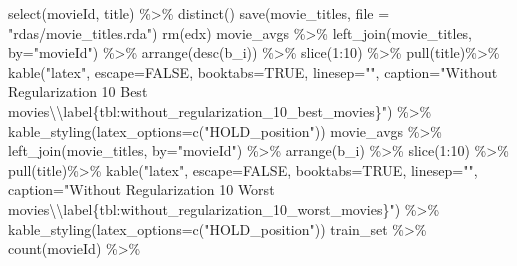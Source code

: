 \documentclass[
]{article}
\newenvironment{Shaded}{}{}
\newcommand{\AttributeTok}[1]{\textcolor[rgb]{0.49,0.56,0.16}{#1}}
\newcommand{\ConstantTok}[1]{\textcolor[rgb]{0.53,0.00,0.00}{#1}}
\newcommand{\DecValTok}[1]{\textcolor[rgb]{0.25,0.63,0.44}{#1}}
\newcommand{\FunctionTok}[1]{\textcolor[rgb]{0.02,0.16,0.49}{#1}}
\newcommand{\NormalTok}[1]{#1}
\newcommand{\SpecialCharTok}[1]{\textcolor[rgb]{0.25,0.44,0.63}{#1}}
\newcommand{\StringTok}[1]{\textcolor[rgb]{0.25,0.44,0.63}{#1}}
\begin{document}
\begin{Shaded}
\begin{Highlighting}[]
  \FunctionTok{select}\NormalTok{(movieId, title) }\SpecialCharTok{\%\textgreater{}\%}
  \FunctionTok{distinct}\NormalTok{()}
\FunctionTok{save}\NormalTok{(movie\_titles, }\AttributeTok{file =} \StringTok{"rdas/movie\_titles.rda"}\NormalTok{)}
\FunctionTok{rm}\NormalTok{(edx)}
\NormalTok{movie\_avgs }\SpecialCharTok{\%\textgreater{}\%} \FunctionTok{left\_join}\NormalTok{(movie\_titles, }\AttributeTok{by=}\StringTok{"movieId"}\NormalTok{) }\SpecialCharTok{\%\textgreater{}\%}
  \FunctionTok{arrange}\NormalTok{(}\FunctionTok{desc}\NormalTok{(b\_i)) }\SpecialCharTok{\%\textgreater{}\%} 
  \FunctionTok{slice}\NormalTok{(}\DecValTok{1}\SpecialCharTok{:}\DecValTok{10}\NormalTok{)  }\SpecialCharTok{\%\textgreater{}\%} 
  \FunctionTok{pull}\NormalTok{(title)}\SpecialCharTok{\%\textgreater{}\%} 
  \FunctionTok{kable}\NormalTok{(}\StringTok{"latex"}\NormalTok{, }\AttributeTok{escape=}\ConstantTok{FALSE}\NormalTok{, }\AttributeTok{booktabs=}\ConstantTok{TRUE}\NormalTok{, }\AttributeTok{linesep=}\StringTok{""}\NormalTok{, }\AttributeTok{caption=}\StringTok{"Without Regularization 10 Best movies}\SpecialCharTok{\textbackslash{}\textbackslash{}}\StringTok{label\{tbl:without\_regularization\_10\_best\_movies\}"}\NormalTok{) }\SpecialCharTok{\%\textgreater{}\%}
    \FunctionTok{kable\_styling}\NormalTok{(}\AttributeTok{latex\_options=}\FunctionTok{c}\NormalTok{(}\StringTok{"HOLD\_position"}\NormalTok{))}
\NormalTok{movie\_avgs }\SpecialCharTok{\%\textgreater{}\%} \FunctionTok{left\_join}\NormalTok{(movie\_titles, }\AttributeTok{by=}\StringTok{"movieId"}\NormalTok{) }\SpecialCharTok{\%\textgreater{}\%}
  \FunctionTok{arrange}\NormalTok{(b\_i) }\SpecialCharTok{\%\textgreater{}\%} 
  \FunctionTok{slice}\NormalTok{(}\DecValTok{1}\SpecialCharTok{:}\DecValTok{10}\NormalTok{)  }\SpecialCharTok{\%\textgreater{}\%} 
  \FunctionTok{pull}\NormalTok{(title)}\SpecialCharTok{\%\textgreater{}\%} 
  \FunctionTok{kable}\NormalTok{(}\StringTok{"latex"}\NormalTok{, }\AttributeTok{escape=}\ConstantTok{FALSE}\NormalTok{, }\AttributeTok{booktabs=}\ConstantTok{TRUE}\NormalTok{, }\AttributeTok{linesep=}\StringTok{""}\NormalTok{, }\AttributeTok{caption=}\StringTok{"Without Regularization 10 Worst movies}\SpecialCharTok{\textbackslash{}\textbackslash{}}\StringTok{label\{tbl:without\_regularization\_10\_worst\_movies\}"}\NormalTok{) }\SpecialCharTok{\%\textgreater{}\%}
    \FunctionTok{kable\_styling}\NormalTok{(}\AttributeTok{latex\_options=}\FunctionTok{c}\NormalTok{(}\StringTok{"HOLD\_position"}\NormalTok{))}
\NormalTok{train\_set }\SpecialCharTok{\%\textgreater{}\%} \FunctionTok{count}\NormalTok{(movieId) }\SpecialCharTok{\%\textgreater{}\%} 

\end{Highlighting}
\end{Shaded}
\end{document}
